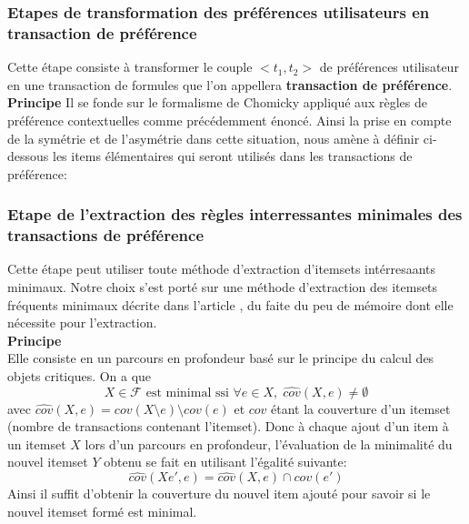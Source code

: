 \documentclass[a4paper,12pt,openany,oneside]{article}
\begin{document}
    
     
    \subsubsection{Etapes de transformation des préférences utilisateurs en transaction de préférence}
    
       Cette étape consiste à transformer le couple $<t_{1},t_{2}>$ de préférences utilisateur en une transaction de formules que l'on appellera \textbf{transaction de préférence}.\\ 
       \textbf{Principe}
       Il se fonde sur le formalisme de Chomicky appliqué aux règles de préférence contextuelles comme précédemment énoncé. Ainsi la prise en compte de la symétrie et de l'asymétrie dans cette situation, nous amène à définir ci-dessous les items élémentaires qui seront utilisés dans les transactions de préférence:\\











 
 
      \subsubsection{Etape de l'extraction des règles interressantes minimales des transactions de préférence}
 	Cette étape peut utiliser toute méthode d'extraction d'itemsets intérresaants minimaux. Notre choix s'est porté sur une méthode d'extraction des itemsets fréquents minimaux décrite dans l'article \cite{SOUL}, du faite du peu de mémoire dont elle nécessite pour l'extraction.\\
 	\textbf{Principe}\\
 	Elle consiste en un parcours en profondeur basé sur le principe du calcul des objets critiques. On a que
 	\[
 		X\in \mathcal{F}\text{ est minimal ssi }\forall e \in X,\; \widehat{cov}(X,e)\neq \emptyset
 	\]
 	avec $\widehat{cov}(X,e)=cov(X\setminus e)\setminus cov(e)$ et $cov$ étant la couverture d'un itemset (nombre de transactions contenant l'itemset). Donc à chaque ajout d'un item à un itemset $X$ lors d'un parcours en profondeur, l'évaluation de la minimalité du nouvel itemset $Y$ obtenu se fait en utilisant l'égalité suivante:
 	\[
 		 	\widehat{cov}(Xe',e)=\widehat{cov}(X,e)\cap cov(e')
 	\]
 	Ainsi il suffit d'obtenir la couverture du nouvel item ajouté pour savoir si le nouvel itemset formé est minimal.
 	
\end{document}
